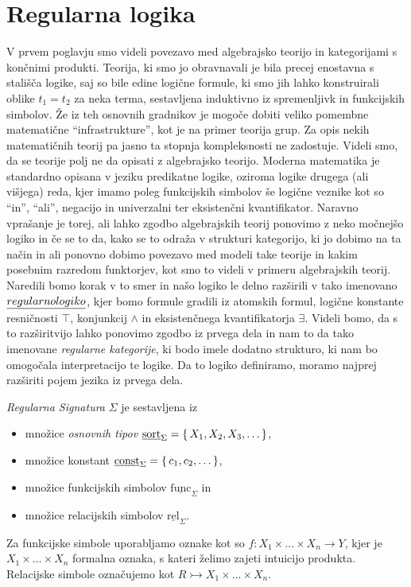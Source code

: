 \documentclass[../kategoricna_logika.tex]{subfiles}
\begin{document}
\section{Regularna logika}
V prvem poglavju smo videli povezavo med algebrajsko teorijo
in kategorijami s končnimi produkti.
Teorija, ki smo jo obravnavali je bila precej enostavna s stališča logike,
saj so bile edine logične formule, ki smo jih lahko konstruirali oblike
$t_1 = t_2$ za neka terma, sestavljena induktivno iz spremenljivk in funkcijskih simbolov. 
Že iz teh osnovnih gradnikov je mogoče dobiti veliko pomembne matematične ``infrastrukture'',
kot je na primer teorija grup.
Za opis nekih matematičnih teorij pa jasno ta stopnja kompleksnosti ne zadostuje.
Videli smo, da se teorije polj ne da opisati z algebrajsko teorijo.
Moderna matematika je standardno opisana v jeziku predikatne logike,
oziroma logike drugega (ali višjega) reda,
kjer imamo poleg funkcijskih simbolov še logične veznike kot so ``in'', ``ali'',
negacijo in univerzalni ter eksistenčni kvantifikator.
Naravno vprašanje je torej, ali lahko zgodbo algebrajskih teorij
ponovimo z neko močnejšo logiko in če se to da,
kako se to odraža v strukturi kategorijo,
ki jo dobimo na ta način in ali ponovno dobimo povezavo med modeli take teorije
in kakim posebnim razredom funktorjev, kot smo to videli v primeru algebrajskih teorij.
Naredili bomo korak v to smer in našo logiko le delno razširili v tako imenovano
$\emph{regularno logiko}$, kjer bomo formule gradili iz atomskih formul,
logične konstante resničnosti $\top$, konjunkcij $\wedge$
in eksistenčnega kvantifikatorja $\exists$.
Videli bomo, da s to razširitvijo lahko ponovimo zgodbo iz prvega dela in nam to da
tako imenovane \emph{regularne kategorije}, ki bodo imele dodatno strukturo,
ki nam bo omogočala interpretacijo te logike.
Da to logiko definiramo, moramo najprej razširiti pojem jezika iz prvega dela.
%
\begin{definicija}
\emph{Regularna Signatura} $\Sigma$ je sestavljena iz
\begin{itemize}
  \item množice \emph{osnovnih tipov} $\underline{\mathrm{sort}}_\Sigma = \left\lbrace\,X_1, X_2, X_3, \ldots\,\right\rbrace$,
  \item množice konstant $\underline{\mathrm{const}}_\Sigma = \left\lbrace\,c_1, c_2, \ldots\,\right\rbrace$,
  \item množice funkcijskih simbolov $\underline{\mathrm{func}}_\Sigma$ in
  \item množice relacijskih simbolov $\underline{\mathrm{rel}}_\Sigma$.
\end{itemize}
Za funkcijske simbole uporabljamo oznake kot so $f : X_1 \times \ldots \times X_n \to Y$,
kjer je $X_1 \times \ldots \times X_n$ formalna oznaka, s kateri želimo zajeti intuicijo produkta.
Relacijske simbole označujemo kot $R \rightarrowtail X_1 \times \ldots \times X_n$.
\end{definicija}
\end{document}
